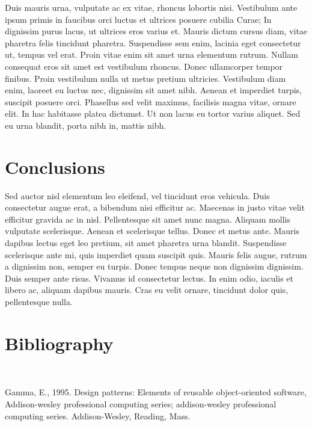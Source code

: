 \documentclass[final]{beamer}
\begin{document}
\begin{frame}[t]
\begin{multicols}{3}
Duis mauris urna, vulputate ac ex vitae, rhoncus lobortis nisi.
Vestibulum ante ipsum primis in faucibus orci luctus et ultrices posuere
cubilia Curae; In dignissim purus lacus, ut ultrices eros varius et.
Mauris dictum cursus diam, vitae pharetra felis tincidunt pharetra.
Suspendisse sem enim, lacinia eget consectetur ut, tempus vel erat.
Proin vitae enim sit amet urna elementum rutrum. Nullam consequat eros
sit amet est vestibulum rhoncus. Donec ullamcorper tempor finibus. Proin
vestibulum nulla ut metus pretium ultricies. Vestibulum diam enim,
laoreet eu luctus nec, dignissim sit amet nibh. Aenean et imperdiet
turpis, suscipit posuere orci. Phasellus sed velit maximus, facilisis
magna vitae, ornare elit. In hac habitasse platea dictumst. Ut non lacus
eu tortor varius aliquet. Sed eu urna blandit, porta nibh in, mattis
nibh.

\section{Conclusions}\label{conclusions}

Sed auctor nisl elementum leo eleifend, vel tincidunt eros vehicula.
Duis consectetur augue erat, a bibendum nisi efficitur ac. Maecenas in
justo vitae velit efficitur gravida ac in nisl. Pellentesque sit amet
nunc magna. Aliquam mollis vulputate scelerisque. Aenean et scelerisque
tellus. Donec et metus ante. Mauris dapibus lectus eget leo pretium, sit
amet pharetra urna blandit. Suspendisse scelerisque ante mi, quis
imperdiet quam suscipit quis. Mauris felis augue, rutrum a dignissim
non, semper eu turpis. Donec tempus neque non dignissim dignissim. Duis
semper ante risus. Vivamus id consectetur lectus. In enim odio, iaculis
et libero ac, aliquam dapibus mauris. Cras eu velit ornare, tincidunt
dolor quis, pellentesque nulla.

\section{Bibliography}\label{bibliography}

~

\hypertarget{refs}{}
\hypertarget{ref-gammaux5fdesignux5f1995}{}
Gamma, E., 1995. Design patterns: Elements of reusable object-oriented
software, Addison-wesley professional computing series; addison-wesley
professional computing series. Addison-Wesley, Reading, Mass.



\end{multicols}
\end{frame}
\end{document}
